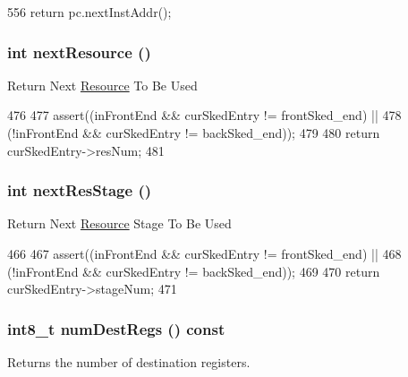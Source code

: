\begin{DoxyCode}
556 { return pc.nextInstAddr(); }
\end{DoxyCode}
\hypertarget{classInOrderDynInst_a2a5d40a6b54c058587d5f955711ffd11}{
\subsubsection[{nextResource}]{\setlength{\rightskip}{0pt plus 5cm}int nextResource ()}}
\label{classInOrderDynInst_a2a5d40a6b54c058587d5f955711ffd11}
Return Next \hyperlink{classResource}{Resource} To Be Used 


\begin{DoxyCode}
476     {
477         assert((inFrontEnd && curSkedEntry != frontSked_end) ||
478                (!inFrontEnd && curSkedEntry != backSked_end));
479 
480         return curSkedEntry->resNum;
481     }
\end{DoxyCode}
\hypertarget{classInOrderDynInst_aa02e7187dfc8362ccab8d685f87c2761}{
\subsubsection[{nextResStage}]{\setlength{\rightskip}{0pt plus 5cm}int nextResStage ()}}
\label{classInOrderDynInst_aa02e7187dfc8362ccab8d685f87c2761}
Return Next \hyperlink{classResource}{Resource} Stage To Be Used 


\begin{DoxyCode}
466     {
467         assert((inFrontEnd && curSkedEntry != frontSked_end) ||
468                (!inFrontEnd && curSkedEntry != backSked_end));
469 
470         return curSkedEntry->stageNum;
471     }
\end{DoxyCode}
\hypertarget{classInOrderDynInst_ab7e23352b3d45a982dfeb799030f87d0}{
\subsubsection[{numDestRegs}]{\setlength{\rightskip}{0pt plus 5cm}int8\_\-t numDestRegs () const}}
\label{classInOrderDynInst_ab7e23352b3d45a982dfeb799030f87d0}
Returns the number of destination registers. 



